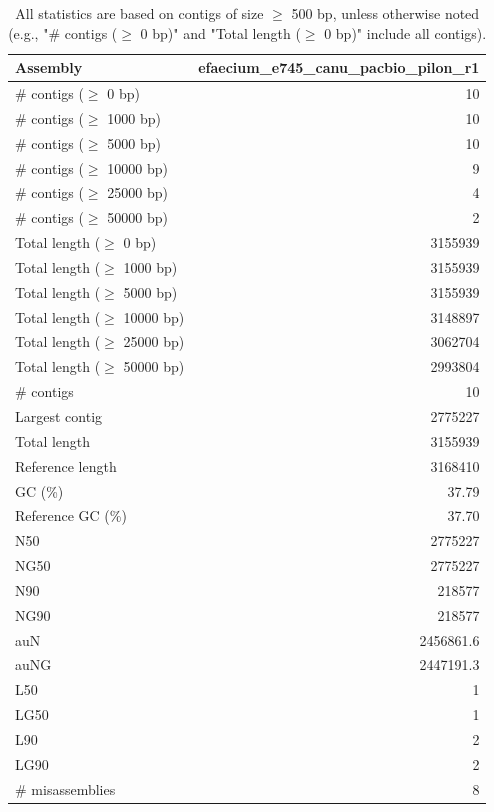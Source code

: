 \documentclass[12pt,a4paper]{article}
\begin{document}
\begin{table}[ht]
\begin{center}
\caption{All statistics are based on contigs of size $\geq$ 500 bp, unless otherwise noted (e.g., "\# contigs ($\geq$ 0 bp)" and "Total length ($\geq$ 0 bp)" include all contigs).}
\begin{tabular}{|l*{1}{|r}|}
\hline
Assembly & efaecium\_e745\_canu\_pacbio\_pilon\_r1 \\ \hline
\# contigs ($\geq$ 0 bp) & 10 \\ \hline
\# contigs ($\geq$ 1000 bp) & 10 \\ \hline
\# contigs ($\geq$ 5000 bp) & 10 \\ \hline
\# contigs ($\geq$ 10000 bp) & 9 \\ \hline
\# contigs ($\geq$ 25000 bp) & 4 \\ \hline
\# contigs ($\geq$ 50000 bp) & 2 \\ \hline
Total length ($\geq$ 0 bp) & 3155939 \\ \hline
Total length ($\geq$ 1000 bp) & 3155939 \\ \hline
Total length ($\geq$ 5000 bp) & 3155939 \\ \hline
Total length ($\geq$ 10000 bp) & 3148897 \\ \hline
Total length ($\geq$ 25000 bp) & 3062704 \\ \hline
Total length ($\geq$ 50000 bp) & 2993804 \\ \hline
\# contigs & 10 \\ \hline
Largest contig & 2775227 \\ \hline
Total length & 3155939 \\ \hline
Reference length & 3168410 \\ \hline
GC (\%) & 37.79 \\ \hline
Reference GC (\%) & 37.70 \\ \hline
N50 & 2775227 \\ \hline
NG50 & 2775227 \\ \hline
N90 & 218577 \\ \hline
NG90 & 218577 \\ \hline
auN & 2456861.6 \\ \hline
auNG & 2447191.3 \\ \hline
L50 & 1 \\ \hline
LG50 & 1 \\ \hline
L90 & 2 \\ \hline
LG90 & 2 \\ \hline
\# misassemblies & 8 \\ \hline

\end{tabular}
\end{center}
\end{table}
\end{document}
